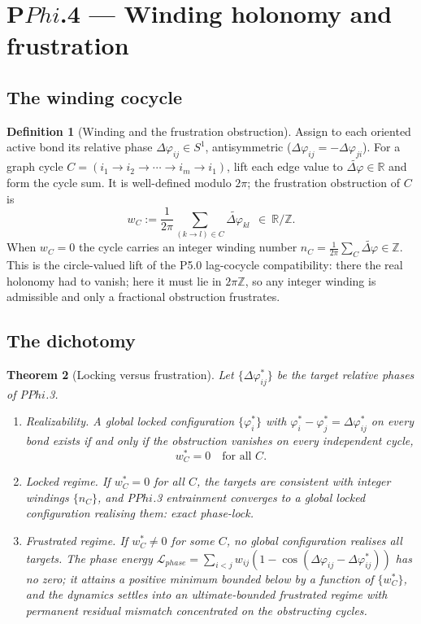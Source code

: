 \documentclass[11pt,a4paper]{article}
\def\Phi{Phi}%
\def\mathrm#1{#1}%
\def\emph#1{#1}%
\theoremstyle{definition}
\newtheorem{definition}{Definition}[section]
\theoremstyle{plain}
\newtheorem{theorem}[definition]{Theorem}
\theoremstyle{remark}
\begin{document}
\section{P$\Phi$.4 --- Winding holonomy and frustration}

\subsection{The winding cocycle}

\begin{definition}[Winding and the frustration obstruction]\label{def:winding}
Assign to each oriented active bond its relative phase \(\Delta\varphi_{ij}\in S^1\),
antisymmetric (\(\Delta\varphi_{ij}=-\Delta\varphi_{ji}\)). For a graph cycle
\(C=(i_1\!\to\! i_2\!\to\!\cdots\!\to\! i_m\!\to\! i_1)\), lift each edge value to
\(\widetilde{\Delta\varphi}\in\mathbb R\) and form the cycle sum. It is well-defined modulo
\(2\pi\); the \emph{frustration obstruction} of \(C\) is
\[
\boxed{\;
w_C:=\frac{1}{2\pi}\sum_{(k\to l)\in C}\widetilde{\Delta\varphi}_{kl}\ \ \in\ \mathbb R/\mathbb Z .
\;}
\]
When \(w_C=0\) the cycle carries an integer \emph{winding number}
\(n_C=\tfrac{1}{2\pi}\sum_C\widetilde{\Delta\varphi}\in\mathbb Z\). This is the circle-valued
lift of the P5.0 lag-cocycle compatibility: there the real holonomy had to vanish; here it
must lie in \(2\pi\mathbb Z\), so any integer winding is admissible and only a fractional
obstruction frustrates.
\end{definition}

\subsection{The dichotomy}

\begin{theorem}[Locking versus frustration]\label{thm:frustration}
Let \(\{\Delta\varphi_{ij}^{*}\}\) be the target relative phases of P$\Phi$.3.
\begin{enumerate}[label=\textup{(\alph*)},leftmargin=1.2cm]
\item \emph{Realizability.} A global locked configuration \(\{\varphi_i^{*}\}\) with
\(\varphi_i^{*}-\varphi_j^{*}=\Delta\varphi_{ij}^{*}\) on every bond exists if and only if the
obstruction vanishes on every independent cycle,
\[
w_C^{*}=0\quad\text{for all }C .
\]
\item \emph{Locked regime.} If \(w_C^{*}=0\) for all \(C\), the targets are consistent with
integer windings \(\{n_C\}\), and P$\Phi$.3 entrainment converges to a global locked
configuration realising them: \emph{exact} phase-lock.
\item \emph{Frustrated regime.} If \(w_C^{*}\neq0\) for some \(C\), no global configuration
realises all targets. The phase energy
\(\mathcal L_{\mathrm{phase}}=\sum_{i<j}w_{ij}(1-\cos(\Delta\varphi_{ij}-\Delta\varphi_{ij}^{*}))\)
has no zero; it attains a positive minimum bounded below by a function of \(\{w_C^{*}\}\), and
the dynamics settles into an \emph{ultimate-bounded frustrated regime} with permanent residual
mismatch concentrated on the obstructing cycles.
\end{enumerate}
\end{theorem}
\end{document}
